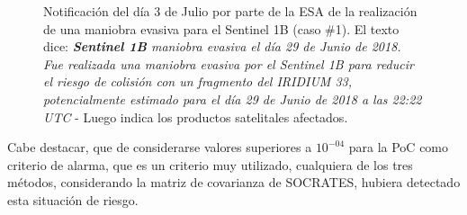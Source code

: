  \begin{figure}[H]
  \centering
  \caption{Notificaci\'on del d\'ia 3 de Julio por parte de la ESA de la realizaci\'on de una maniobra evasiva para el Sentinel 1B (caso \#1). El texto dice: {\it{{\bf{Sentinel 1B}} maniobra evasiva el d\'ia 29 de Junio de 2018. Fue realizada una maniobra evasiva por el Sentinel 1B para reducir el riesgo de colisi\'on con un fragmento del IRIDIUM 33, potencialmente estimado para el d\'ia 29 de Junio de 2018 a las 22:22 UTC}} - Luego indica los productos satelitales afectados.}
  \label{fig:envisatRMM}
\end{figure}

Cabe destacar, que de considerarse valores superiores a $10^{-04}$ para la PoC como criterio de alarma, que es un criterio muy utilizado, cualquiera de los tres m\'etodos, considerando la matriz de covarianza de SOCRATES, hubiera detectado esta situaci\'on de riesgo. 

